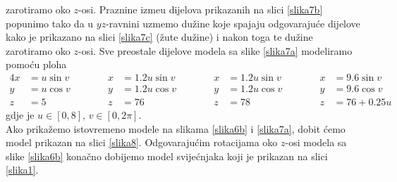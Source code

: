 \documentclass[a4paper,12pt]{article}
\theoremstyle{zad}
\begin{document}
zarotiramo oko $z$-osi. Praznine izme\dj u dijelova prikazanih na slici \ref{slika7b} popunimo tako da
u $yz$-ravnini uzmemo du\v{z}ine koje spajaju odgovaraju\'ce dijelove kako je prikazano na slici \ref{slika7c} (\v{z}ute du\v{z}ine) i nakon toga te du\v{z}ine zarotiramo oko $z$-osi. Sve preostale dijelove modela sa slike \ref{slika7a} modeliramo pomo\'cu ploha
\begin{alignat*}{4}
x&=u\sin{v}&\qquad\quad x&=1.2u\sin{v}&\qquad\quad x&=1.2u\sin{v}&\qquad\quad x&=9.6\sin{v}\\[3pt]
y&=u\cos{v}&\qquad\quad y&=1.2u\cos{v}&\qquad\quad y&=1.2u\cos{v}&\qquad\quad y&=9.6\cos{v}\\[3pt]
z&=5&\qquad\quad z&=76&\qquad\quad z&=78&\qquad\quad z&=76+0.25u 
\end{alignat*}
gdje je $u\in[0,8],\,v\in[0,2\pi]$.\\[5pt]
Ako prika\v{z}emo istovremeno modele na slikama \ref{slika6b} i \ref{slika7a}, dobit \'cemo model prikazan na slici \ref{slika8}. 
Odgovaraju\'cim rotacijama oko $z$-osi modela sa slike \ref{slika6b} kona\v{c}no dobijemo model svije\'cnjaka koji je prikazan na slici \ref{slika1}.      

 
\end{document}
